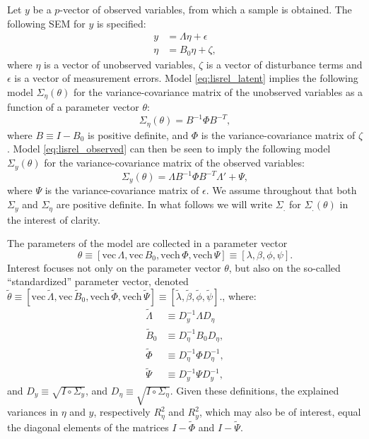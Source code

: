 \documentclass[a4paper,11pt]{article}
\newcommand{\n}{\eta}
\renewcommand{\l}{\lambda}
\newcommand{\definedas}{\equiv}
\newcommand{\hadaprod}{\circ}
\renewcommand{\vec}{\mathrm{vec}\,}
\newcommand{\vech}{\mathrm{vech}\,}
\newcommand{\Lambdastan}{\tilde{\Lambda}}
\newcommand{\Bstan}{\tilde{B}}
\newcommand{\Phistan}{\tilde{\Phi}}
\newcommand{\Psistan}{\tilde{\Psi}}
\newcommand{\thetastan}{\tilde{\theta}}
\newcommand{\0}{\boldsymbol{0}}
\begin{document}
Let $y$ be a $p$-vector of observed variables, from which a sample is obtained.
The following SEM for $y$ is specified:
\begin{align}
\label{eq:lisrel_observed}
y &= \Lambda \n + \epsilon\\
\n &= B_0 \n + \zeta,\label{eq:lisrel_latent}
\end{align}
where $\n$ is a vector of unobserved variables, $\zeta$ is a vector of
disturbance terms and $\epsilon$ is a vector of measurement errors. Model
\ref{eq:lisrel_latent} implies the following model
$\Sigma_\n(\theta)$ for the variance-covariance matrix of the unobserved
variables as a function of a parameter vector $\theta$: 
\begin{equation}\label{eq:sigma_n}
    \Sigma_\n(\theta) = B^{-1} \Phi B^{-T},
\end{equation}
where $B \definedas I - B_0$ is positive definite, 
and $\Phi$ is the variance-covariance
matrix of $\zeta$. Model \ref{eq:lisrel_observed} can then be seen to imply the
following model $\Sigma_y(\theta)$ for the variance-covariance matrix of the
observed variables:
\begin{equation}\label{eq:sigma_y}
    \Sigma_y(\theta) = \Lambda B^{-1} \Phi B^{-T} \Lambda' + \Psi,
\end{equation}
where  $\Psi$ is the variance-covariance matrix of $\epsilon$. 
We assume throughout that both $\Sigma_y$ and $\Sigma_\n$ are positive
definite. In what follows we will write $\Sigma_.$ for $\Sigma_.(\theta)$ in
the interest of clarity.

The parameters of the model are collected in a parameter
vector 
$$
\theta \definedas [\vec{\Lambda},  \vec B_0, \vech{\Phi}, \vech
\Psi] 
\definedas [\l, \beta, \phi, \psi].
$$
Interest focuses not only on the parameter vector $\theta$, 
but also on the so-called ``standardized'' parameter vector, denoted
$\thetastan \definedas [\vec\Lambdastan, \vec\Bstan_0, \vech\Phistan, \vech\Psistan] 
\definedas [\tilde\l, \tilde\beta, \tilde\phi, \tilde\psi].
$, where:
\begin{align}\label{eq:lambda_s}
    \Lambdastan &\definedas D^{-1}_y \Lambda D_\n
    \\
    \Bstan_0 &\definedas D^{-1}_\n B_0 D_\n,\label{eq:beta_s}
    \\
    \Phistan  &\definedas D^{-1}_\n \Phi D^{-1}_\n,\label{eq:phi_s}
    \\
        \Psistan  &\definedas D^{-1}_y \Psi D^{-1}_y\label{eq:psi_s},
\end{align}
and $D_y \definedas \sqrt{I \hadaprod \Sigma_y}$, and 
$D_\n \definedas \sqrt{I \hadaprod \Sigma_\n}$. 
Given these definitions, the explained variances in $\n$ and $y$, respectively $R^2_\n$ and $R^2_y$, 
which may also be of interest,  equal the diagonal elements of the matrices $I - \tilde\Phi$ and $I - \tilde\Psi$. 
\end{document}
